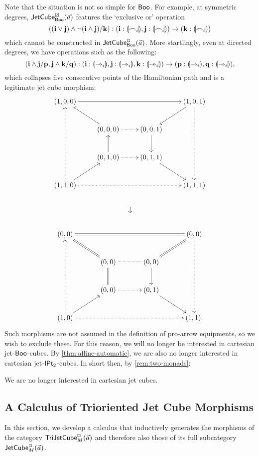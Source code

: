\documentclass[a4paper]{article}
\begin{document}
Note that the situation is not so simple for $\mathsf{Boo}$.
For example, at symmetric degrees, $\mathsf{JetCube}^{\boxslash}_{\mathsf{Boo}}\mathopen{}\left( \vec a \right)\mathclose{}$ features the `exclusive or' operation
\[
	((\mathbf{i} \vee \mathbf{j}) \wedge \lnot(\mathbf{i} \wedge \mathbf{j})/\mathbf{k}) : (\mathbf{i} : {\llparenthesis \frown_i \rrparenthesis}, \mathbf{j} : {\llparenthesis \frown_i \rrparenthesis}) \to (\mathbf{k} : {\llparenthesis \frown_i \rrparenthesis})
\]
which cannot be constructed in $\mathsf{JetCube}^{\Box}_{\mathsf{Boo}}\mathopen{}\left( \vec a \right)\mathclose{}$.
More startlingly, even at directed degrees, we have operations such as the following:
\[
	(\mathbf{i} \wedge \mathbf{j}/\mathbf{p}, \mathbf{j} \wedge \mathbf{k}/\mathbf{q}) : (\mathbf{i} : {\llparenthesis \rightarrowtriangle_i \rrparenthesis}, \mathbf{j} : {\llparenthesis \rightarrowtriangle_i \rrparenthesis}, \mathbf{k} : {\llparenthesis \rightarrowtriangle_i \rrparenthesis}) \to (\mathbf{p} : {\llparenthesis \rightarrowtriangle_i \rrparenthesis}, \mathbf{q} : {\llparenthesis \rightarrowtriangle_i \rrparenthesis}),
\]
which collapses five consecutive points of the Hamiltonian path and is a legitimate jet cube morphism:
\[
	\xymatrix{
		(1, 0, 0)
			\ar[rrr]
		&&& (1, 0, 1)
			\ar[ld]
			\ar@{.>}[ddd]
		\\
		& (0, 0, 0)
			\ar[lu]
			\ar@{.>}[r]
		& (0, 0, 1)
			\ar[d]
		\\
		& (0, 1, 0)
			\ar[u]
			\ar@{.>}[r]
		& (0, 1, 1)
			\ar[rd]
		\\
		(1, 1, 0)
			\ar[ru]
			\ar@{.>}[uuu]
			\ar@{.>}[rrr]
			\ar@{}[rrrdd]|{\rotatebox{270}{$\mapsto$}}
		&&& (1, 1, 1)
		\\
		\\
		(0, 0)
			\ar@{=}[rrr]
		&&& (0, 0)
			\ar@{=}[ld]
			\ar@{.>}[ddd]
		\\
		& (0, 0)
			\ar@{=}[lu]
			\ar@{:}[r]
		& (0, 0)
			\ar[d]
		\\
		& (0, 0)
			\ar@{=}[u]
			\ar@{.>}[r]
		& (0, 1)
			\ar[rd]
		\\
		(1, 0)
			\ar[ru]
			\ar@{.>}[uuu]
			\ar@{.>}[rrr]
		&&& (1, 1).
	}
\]
Such morphisms are not assumed in the definition of pro-arrow equipments, so we wish to exclude these.
For this reason, we will no longer be interested in cartesian jet-$\mathsf{Boo}$-cubes.
By \cref{thm:affine-automatic}, we are also no longer interested in cartesian jet-${\mathsf{IPt}_2}$-cubes.
In short then, by \cref{rem:two-monads}:
\begin{remark} \label{rem:no-cartesian}
	We are no longer interested in cartesian jet cubes.
\end{remark}

\subsection{A Calculus of Trioriented Jet Cube Morphisms}
In this section, we develop a calculus that inductively generates the morphisms of the category \linebreak $\mathsf{TriJetCube}^{\Box}_{M}\mathopen{}\left( \vec a \right)\mathclose{}$ and therefore also those of its full subcategory $\mathsf{JetCube}^{\Box}_{M}\mathopen{}\left( \vec a \right)\mathclose{}$.
\end{document}
